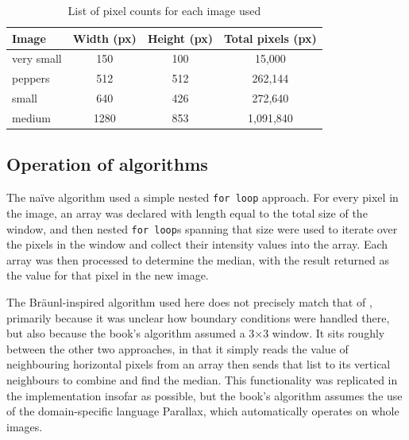 \begin{table}
\centering
\caption{List of pixel counts for each image used}
\label{tab:median:pixelcounts}
\begin{tabular}{@{}lccc@{}}
\toprule
\textbf{Image} & \multicolumn{1}{c}{\textbf{Width (px)}} & \multicolumn{1}{c}{\textbf{Height (px)}} & \multicolumn{1}{c}{\textbf{Total pixels (px)}} \\ \midrule
very small                         & 150                                     & 100                                      & 15,000                                         \\
peppers                            & 512                                     & 512                                      & 262,144                                        \\
small                              & 640                                     & 426                                      & 272,640                                        \\
medium                             & 1280                                    & 853                                      & 1,091,840                                      \\ \bottomrule
\end{tabular}
\end{table}

\subsection{Operation of algorithms}
The naïve algorithm used a simple nested \texttt{for loop} approach.  For every pixel in the image, an array was declared with length equal to the total size of the window, and then nested \texttt{for loop}s spanning that size were used to iterate over the pixels in the window and collect their intensity values into the array.  Each array was then processed to determine the median, with the result returned as the value for that pixel in the new image.

The Bräunl-inspired algorithm used here does not precisely match that of \cite{Braunl2001}, primarily because it was unclear how boundary conditions were handled there, but also because the book's algorithm assumed a 3×3 window.  It sits roughly between the other two approaches, in that it simply reads the value of neighbouring horizontal pixels from an array then sends that list to its vertical neighbours to combine and find the median.  This functionality was replicated in the implementation insofar as possible, but the book's algorithm assumes the use of the domain-specific language Parallax, which automatically operates on whole images.

